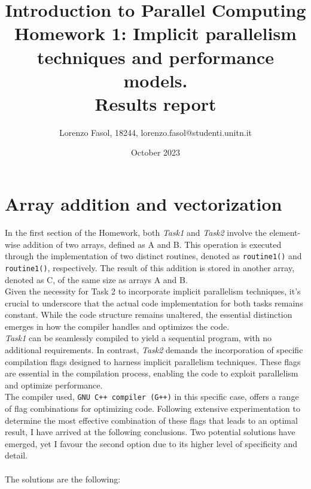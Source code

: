 \documentclass{article}
\begin{document}
\title{Introduction to Parallel Computing\\
    Homework 1: Implicit parallelism techniques and performance models.\\
    \textbf{Results report}
}
\author{Lorenzo Fasol, 18244, lorenzo.fasol@studenti.unitn.it}
\date{October 2023}
\maketitle

\section{Array addition and vectorization}
In the first section of the Homework, both \textit{Task1} and \textit{Task2} involve the element-wise addition of two arrays, defined as A and B. This operation is executed through the implementation of two distinct routines, denoted as \texttt{routine1()} and \texttt{routine1()}, respectively. The result of this addition is stored in another array, denoted as C, of the same size as arrays A and B.\\
Given the necessity for Task 2 to incorporate implicit parallelism techniques, it's crucial to underscore that the actual code implementation for both tasks remains constant. While the code structure remains unaltered, the essential distinction emerges in how the compiler handles and optimizes the code.\\
\textit{Task1} can be seamlessly compiled to yield a sequential program, with no additional requirements. In contrast, \textit{Task2} demands the incorporation of specific compilation flags designed to harness implicit parallelism techniques. These flags are essential in the compilation process, enabling the code to exploit parallelism and optimize performance.\\
The compiler used, \texttt{GNU C++ compiler (G++)} in this specific case, offers a range of flag combinations for optimizing code. Following extensive experimentation to determine the most effective combination of these flags that leads to an optimal result, I have arrived at the following conclusions. Two potential solutions have emerged, yet I favour the second option due to its higher level of specificity and detail.\\\\
The solutions are the following:
\end{document}
